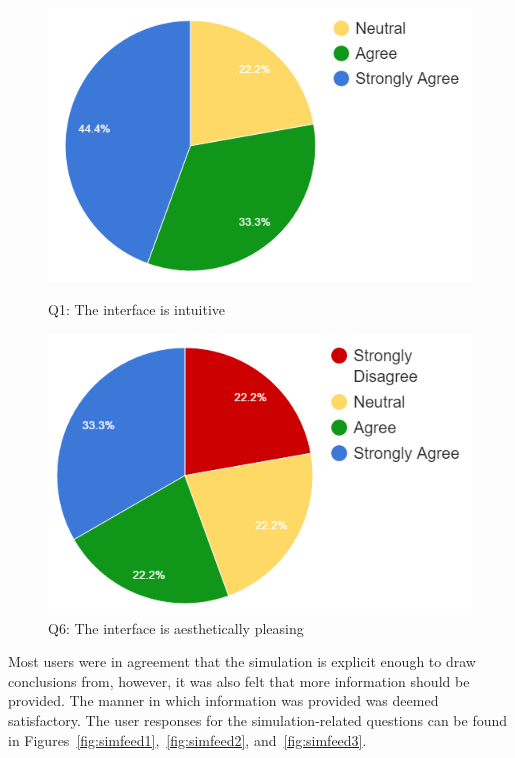 \begin{figure}[!th]
	\centering
	\begin{minipage}[b]{0.49\textwidth}
		\includegraphics[scale=0.6]{images/q1}
		\caption{\label{fig:uifeed1}Q1: The interface is intuitive}
	\end{minipage}
	\hfill
	\begin{minipage}[b]{0.5\textwidth}
		\includegraphics[scale=0.6]{images/q2}
		\caption{\label{fig:uifeed2}Q6: The interface is aesthetically pleasing}
	\end{minipage}
\end{figure}

Most users were in agreement that the simulation is explicit enough to draw conclusions from, however, it was also felt that more information should be provided. The manner in which information was provided was deemed satisfactory. The user responses for the simulation-related questions can be found in Figures~\ref{fig:simfeed1},~\ref{fig:simfeed2}, and~\ref{fig:simfeed3}.

